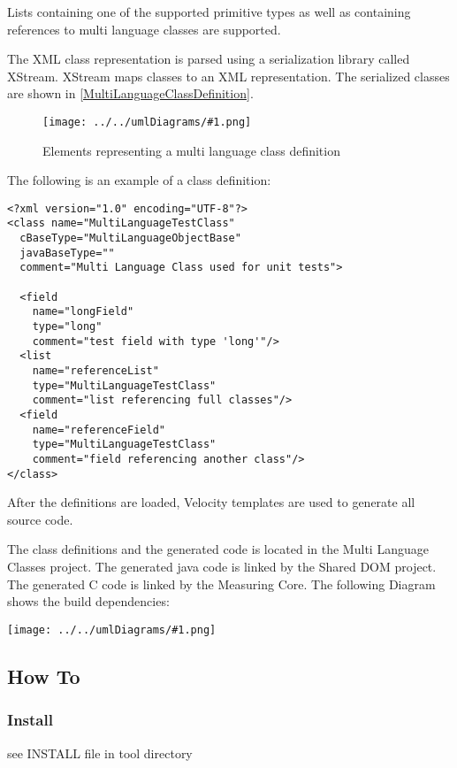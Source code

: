 \documentclass[a4paper,12pt]{article}
\newcommand{\umlDiagram}[1]{\begin{center}\texttt{[image: ../../umlDiagrams/\#1.png]}\end{center}}
\newcommand{\umlFloat}[2]{
\begin{figure}[tbh]
\umlDiagram{#1}
\caption{#2}
\label{#1}
\end{figure}
}
\newcommand{\umlRef}[1]{\autoref{#1}}
\begin{document}
Lists containing one of the supported primitive types as well as containing references to multi language classes are supported.

The XML class representation is parsed using a serialization library called XStream. XStream maps classes to an XML representation. The serialized classes are shown in \umlRef{MultiLanguageClassDefinition}.

\umlFloat{MultiLanguageClassDefinition}{Elements representing a multi language class definition}

The following is an example of a class definition:
\begin{verbatim}
<?xml version="1.0" encoding="UTF-8"?>
<class name="MultiLanguageTestClass" 
  cBaseType="MultiLanguageObjectBase"
  javaBaseType=""
  comment="Multi Language Class used for unit tests">

  <field 
    name="longField" 
    type="long" 
    comment="test field with type 'long'"/>
  <list  
    name="referenceList" 
    type="MultiLanguageTestClass" 
    comment="list referencing full classes"/>
  <field 
    name="referenceField" 
    type="MultiLanguageTestClass" 
    comment="field referencing another class"/>
</class>
\end{verbatim}

After the definitions are loaded, Velocity templates are used to generate all source code.

The class definitions and the generated code is located in the Multi Language Classes project. The generated java code is linked by the Shared DOM project. The generated C code is linked by the Measuring Core. The following Diagram shows the build dependencies:

\umlDiagram{BuildDependencies}

\subsection{How To}
\subsubsection{Install}
see INSTALL file in tool directory
\end{document}
